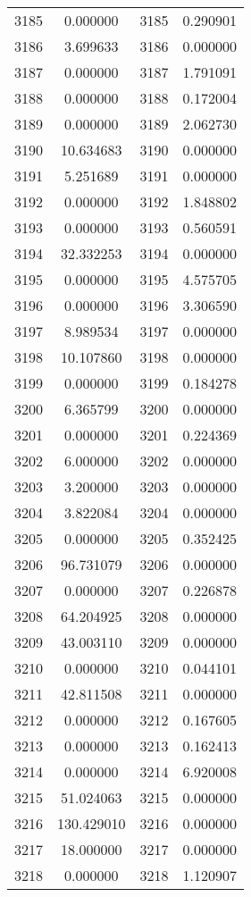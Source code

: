 \documentclass[12pt]{article}
\begin{document}
\begin{longtable}{@{}cccc@{}}
3185 & 0.000000 & 3185 & 0.290901 \\
3186 & 3.699633 & 3186 & 0.000000 \\
3187 & 0.000000 & 3187 & 1.791091 \\
3188 & 0.000000 & 3188 & 0.172004 \\
3189 & 0.000000 & 3189 & 2.062730 \\
3190 & 10.634683 & 3190 & 0.000000 \\
3191 & 5.251689 & 3191 & 0.000000 \\
3192 & 0.000000 & 3192 & 1.848802 \\
3193 & 0.000000 & 3193 & 0.560591 \\
3194 & 32.332253 & 3194 & 0.000000 \\
3195 & 0.000000 & 3195 & 4.575705 \\
3196 & 0.000000 & 3196 & 3.306590 \\
3197 & 8.989534 & 3197 & 0.000000 \\
3198 & 10.107860 & 3198 & 0.000000 \\
3199 & 0.000000 & 3199 & 0.184278 \\
3200 & 6.365799 & 3200 & 0.000000 \\
3201 & 0.000000 & 3201 & 0.224369 \\
3202 & 6.000000 & 3202 & 0.000000 \\
3203 & 3.200000 & 3203 & 0.000000 \\
3204 & 3.822084 & 3204 & 0.000000 \\
3205 & 0.000000 & 3205 & 0.352425 \\
3206 & 96.731079 & 3206 & 0.000000 \\
3207 & 0.000000 & 3207 & 0.226878 \\
3208 & 64.204925 & 3208 & 0.000000 \\
3209 & 43.003110 & 3209 & 0.000000 \\
3210 & 0.000000 & 3210 & 0.044101 \\
3211 & 42.811508 & 3211 & 0.000000 \\
3212 & 0.000000 & 3212 & 0.167605 \\
3213 & 0.000000 & 3213 & 0.162413 \\
3214 & 0.000000 & 3214 & 6.920008 \\
3215 & 51.024063 & 3215 & 0.000000 \\
3216 & 130.429010 & 3216 & 0.000000 \\
3217 & 18.000000 & 3217 & 0.000000 \\
3218 & 0.000000 & 3218 & 1.120907 \\

\end{longtable}
\end{document}

